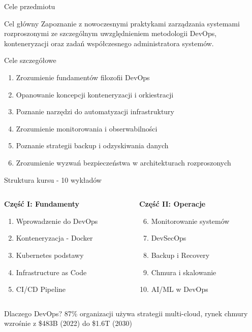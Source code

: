 \documentclass[10pt, aspectratio=169]{beamer}
\begin{document}
\begin{frame}{Cele przedmiotu}
\begin{alertblock}{Cel główny}
Zapoznanie z nowoczesnymi praktykami zarządzania systemami rozproszonymi ze szczególnym uwzględnieniem metodologii DevOps, konteneryzacji oraz zadań współczesnego administratora systemów.
\end{alertblock}

\begin{block}{Cele szczegółowe}
\begin{enumerate}
\item Zrozumienie fundamentów filozofii DevOps
\item Opanowanie koncepcji konteneryzacji i orkiestracji
\item Poznanie narzędzi do automatyzacji infrastruktury
\item Zrozumienie monitorowania i obserwabilności
\item Poznanie strategii backup i odzyskiwania danych
\item Zrozumienie wyzwań bezpieczeństwa w architekturach rozproszonych
\end{enumerate}
\end{block}
\end{frame}

\begin{frame}{Struktura kursu - 10 wykładów}
\begin{columns}[T]
\begin{column}{0.5\textwidth}
\textbf{Część I: Fundamenty}
\begin{enumerate}
\item \textcolor{IBMBlue}{Wprowadzenie do DevOps}
\item Konteneryzacja - Docker
\item Kubernetes podstawy  
\item Infrastructure as Code
\item CI/CD Pipeline
\end{enumerate}
\end{column}
\begin{column}{0.5\textwidth}
\textbf{Część II: Operacje}
\begin{enumerate}
\setcounter{enumi}{5}
\item Monitorowanie systemów
\item DevSecOps
\item Backup i Recovery
\item Chmura i skalowanie
\item AI/ML w DevOps
\end{enumerate}
\end{column}
\end{columns}

\vspace{1cm}
\begin{block}{Dlaczego DevOps?}
87\% organizacji używa strategii multi-cloud, rynek chmury wzrośnie z \$483B (2022) do \$1.6T (2030)
\end{block}
\end{frame}
\end{document}

